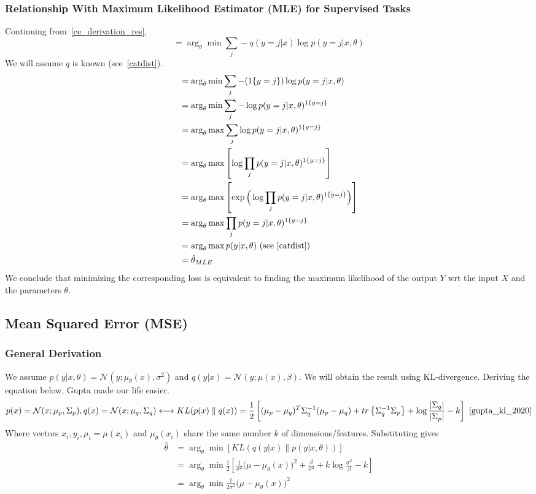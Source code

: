 \documentclass{book}
\numberwithin{equation}{subsection}
\begin{document}
\subsubsection{Relationship With Maximum Likelihood Estimator (MLE) for Supervised Tasks}
\label{mle_ce}
Continuing from~\ref{ce_derivation_res}, 
\begin{equation}
    = \arg_\theta \min \sum_j -q(y=j|x)\log p(y=j|x,\theta)
\end{equation}
We will assume $q$ is known (see~\ref{catdist}).
\begin{align}
    &= \arg_\theta \min \sum_j -(1\{y=j\})\log p(y=j|x,\theta)\\
    &= \arg_\theta \min \sum_j -\log p(y=j|x,\theta)^{1\{y=j\}}\\
    &= \arg_\theta \max \sum_j \log p(y=j|x,\theta)^{1\{y=j\}}\\
    &= \arg_\theta \max\left[\log\prod_j p(y=j|x,\theta)^{1\{y=j\}}\right]\\
    &= \arg_\theta \max\left[\exp\Big(\log\prod_j p(y=j|x,\theta)^{1\{y=j\}}\Big)\right]\\
    &= \arg_\theta \max\prod_j p(y=j|x,\theta)^{1\{y=j\}}\\
    &= \arg_\theta\max p(y|x,\theta) \ \text{(see~\ref{catdist})}\\
    &= \hat{\theta}_{MLE}\label{mle_ce_res}
\end{align}
We conclude that minimizing the corresponding loss is equivalent to finding the maximum likelihood of the output $Y$ wrt the input $X$ and the parameters $\theta$. 
\subsection{Mean Squared Error (MSE)}
\subsubsection{General Derivation}
\label{mse_derivation}
We assume $p(y|x,\theta) = \mathcal{N}(y; \mu_\theta(x),\sigma^2)$ and $q(y|x) = \mathcal{N}(y; \mu(x),\beta)$. We will obtain the result using KL-divergence. Deriving the equation below, Gupta made our life easier.
\begin{equation}
    p(x) = \mathcal{N}(x;\mu_p,\Sigma_p), q(x) = \mathcal{N}(x;\mu_q,\Sigma_q) \longleftrightarrow KL(p(x) \parallel q(x)) = \frac{1}{2}\left[(\mu_p-\mu_q)^T\Sigma_q^{-1}(\mu_p-\mu_q) + tr\left\{\Sigma_q^{-1}\Sigma_p\right\}+\log\frac{|\Sigma_q|}{|\Sigma_p|} - k\right]~\cite{gupta_kl_2020}\label{gupta_kl}
\end{equation}
Where vectors $x_i, y_i, \mu_i=\mu(x_i)$ and $\mu_\theta(x_i)$ share the same number $k$ of dimensions/features. Substituting gives
\begin{align}
    \hat{\theta} 
    &= \arg_\theta \min[KL(q(y|x) \parallel p(y|x,\theta))]\\
    &= \arg_\theta \min\frac{1}{2}\left[\frac{1}{\sigma^2}\big(\mu-\mu_\theta(x)\big)^2 + \frac{\beta}{\sigma^2}+k\log\frac{\sigma^2}{\beta} - k\right]\\
    &= \arg_\theta \min\frac{1}{2\sigma^2}\big(\mu-\mu_\theta(x)\big)^2\label{mse_derivation_res2}
\end{align}
\end{document}
